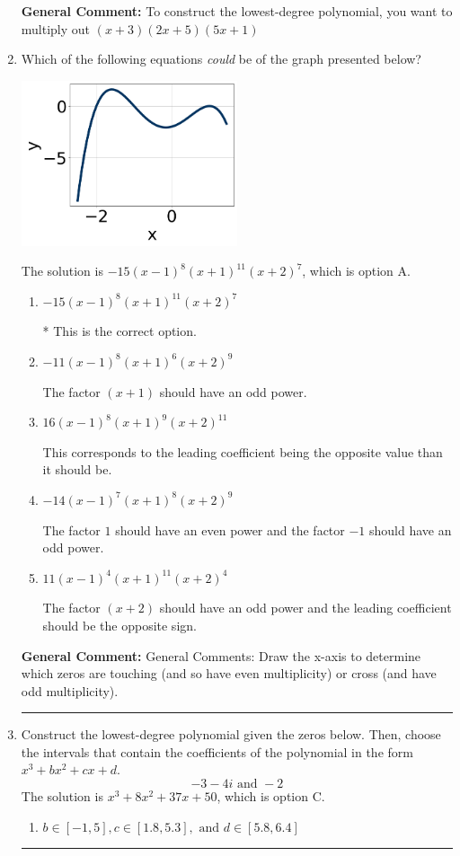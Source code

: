 \documentclass{extbook}[14pt]
\newcommand{\litem}[1]{\item #1

\rule{\textwidth}{0.4pt}}
\begin{document}
\begin{enumerate}
{\textbf{General Comment:} To construct the lowest-degree polynomial, you want to multiply out $(x + 3)(2x + 5)(5x + 1)$
}
\litem{
Which of the following equations \textit{could} be of the graph presented below?

\begin{center}
    \includegraphics[width=0.5\textwidth]{../Figures/polyGraphToFunctionCopyA.png}
\end{center}


The solution is \( -15(x - 1)^{8} (x + 1)^{11} (x + 2)^{7} \), which is option A.\begin{enumerate}[label=\Alph*.]
\item \( -15(x - 1)^{8} (x + 1)^{11} (x + 2)^{7} \)

* This is the correct option.
\item \( -11(x - 1)^{8} (x + 1)^{6} (x + 2)^{9} \)

The factor $(x + 1)$ should have an odd power.
\item \( 16(x - 1)^{8} (x + 1)^{9} (x + 2)^{11} \)

This corresponds to the leading coefficient being the opposite value than it should be.
\item \( -14(x - 1)^{7} (x + 1)^{8} (x + 2)^{9} \)

The factor $1$ should have an even power and the factor $-1$ should have an odd power.
\item \( 11(x - 1)^{4} (x + 1)^{11} (x + 2)^{4} \)

The factor $(x + 2)$ should have an odd power and the leading coefficient should be the opposite sign.
\end{enumerate}

\textbf{General Comment:} General Comments: Draw the x-axis to determine which zeros are touching (and so have even multiplicity) or cross (and have odd multiplicity).
}
\litem{
Construct the lowest-degree polynomial given the zeros below. Then, choose the intervals that contain the coefficients of the polynomial in the form $x^3+bx^2+cx+d$.
\[ -3 - 4 i \text{ and } -2 \]The solution is \( x^{3} +8 x^{2} +37 x + 50 \), which is option C.\begin{enumerate}[label=\Alph*.]
\item \( b \in [-1, 5], c \in [1.8, 5.3], \text{ and } d \in [5.8, 6.4] \)


\end{enumerate}}
\end{enumerate}
\end{document}
